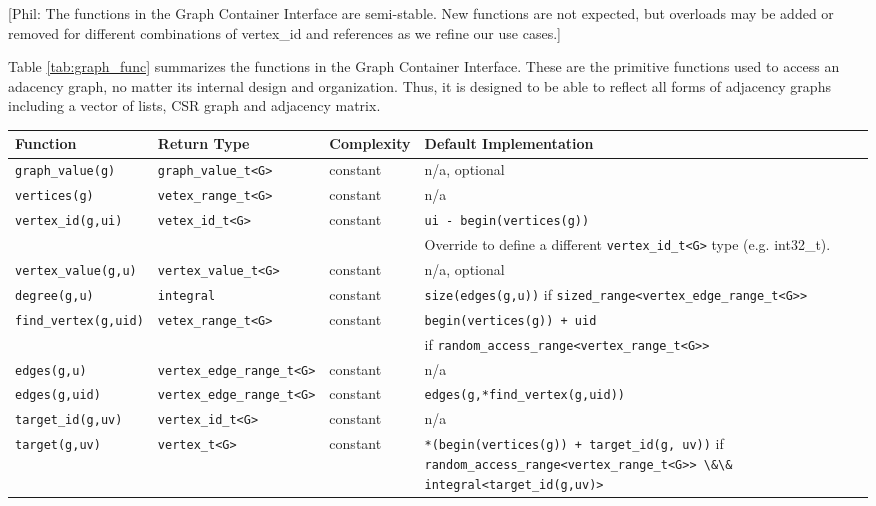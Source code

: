 \documentclass[10pt,onecolumn]{article}
\newcommand{\tcode}[1]{\lstinline[breaklines=true]{#1}}
\newcommand{\comment}[2]{{\color{comment}[{\sc #1:} \textsf{#2}]}}
\newcommand{\phil}[1]{\comment{Phil}{#1}}
\begin{document}
\phil{The functions in the Graph Container Interface are semi-stable. New functions are not expected, but overloads may be added or removed for different combinations of 
vertex\_id and references as we refine our use cases.}

Table \ref{tab:graph_func} summarizes the functions in the Graph Container Interface. These are the primitive functions used to access an adacency graph, no matter its internal design and organization. Thus, it is designed to be able to reflect all forms of adjacency graphs including a vector of lists, CSR graph and adjacency matrix.


\begin{table}[h!]
\begin{center}
\resizebox{\textwidth}{!}
{\begin{tabular}{l l p{1.5cm} L{7.0cm}}
\hline
    \textbf{Function} & \textbf{Return Type} & \textbf{Complexity} & \textbf{Default Implementation} \\
\hline
    \tcode{graph_value(g)} & \tcode{graph_value_t<G>} & constant & n/a, optional \\
\hline
    \tcode{vertices(g)} & \tcode{vetex_range_t<G>} & constant & n/a \\
    \tcode{vertex_id(g,ui)} & \tcode{vetex_id_t<G>} & constant & \tcode{ui - begin(vertices(g))} \\
    & & & Override to define a different \tcode{vertex_id_t<G>} type (e.g. int32\_t). \\
    \tcode{vertex_value(g,u)} & \tcode{vertex_value_t<G>} & constant & n/a, optional \\
    \tcode{degree(g,u)} & \tcode{integral} & constant & \tcode{size(edges(g,u))} if \tcode{sized_range<vertex_edge_range_t<G>>} \\
    \tcode{find_vertex(g,uid)} & \tcode{vetex_range_t<G>} & constant & \tcode{begin(vertices(g)) + uid} \\
    & & & if \tcode{random_access_range<vertex_range_t<G>>}  \\
\hline
    \tcode{edges(g,u)} & \tcode{vertex_edge_range_t<G>} & constant & n/a \\
    \tcode{edges(g,uid)} & \tcode{vertex_edge_range_t<G>} & constant & \tcode{edges(g,*find_vertex(g,uid))} \\
    \tcode{target_id(g,uv)} & \tcode{vertex_id_t<G>} & constant & n/a \\
    \tcode{target(g,uv)} & \tcode{vertex_t<G>} & constant & \tcode{*(begin(vertices(g)) + target_id(g, uv))} if \tcode{random_access_range<vertex_range_t<G>> \&\& integral<target_id(g,uv)>} \\

\end{tabular}}
\end{center}
\end{table}
\end{document}
